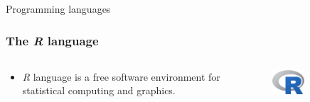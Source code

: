 \documentclass[aspectratio=169]{beamer}
\begin{document}
\begin{frame}
    Programming languages
\end{frame}

\begin{frame}
    \frametitle{The \emph{R} language}
    \begin{columns}
        \begin{column}{0.5\textwidth}
            \begin{itemize}
                \item \textit{R} language is a free software environment for 
                    statistical computing and graphics.
            \end{itemize}
        \end{column}
        \begin{column}{0.5\textwidth}
            \begin{figure}
                \centering
                \includegraphics[width=0.5\textwidth]
                {img/Rlogo.png}
            \end{figure}
        \end{column}
    \end{columns}
\end{frame}
\end{document}
